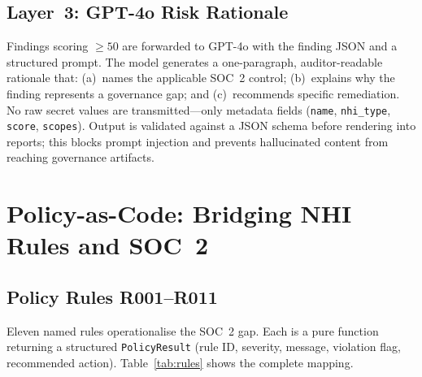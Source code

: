 \documentclass[journal]{IEEEtran}
\begin{document}
\subsection{Layer~3: GPT-4o Risk Rationale}

Findings scoring $\geq 50$ are forwarded to GPT-4o with the finding JSON and a structured prompt. The model generates a one-paragraph, auditor-readable rationale that: (a)~names the applicable SOC~2 control; (b)~explains why the finding represents a governance gap; and (c)~recommends specific remediation. No raw secret values are transmitted---only metadata fields (\texttt{name}, \texttt{nhi\_type}, \texttt{score}, \texttt{scopes}). Output is validated against a JSON schema before rendering into reports; this blocks prompt injection and prevents hallucinated content from reaching governance artifacts.

\section{Policy-as-Code: Bridging NHI Rules and SOC~2}
\label{sec:policy}

\subsection{Policy Rules R001--R011}

Eleven named rules operationalise the SOC~2 gap. Each is a pure function returning a structured \texttt{PolicyResult} (rule ID, severity, message, violation flag, recommended action). Table~\ref{tab:rules} shows the complete mapping.
\end{document}
